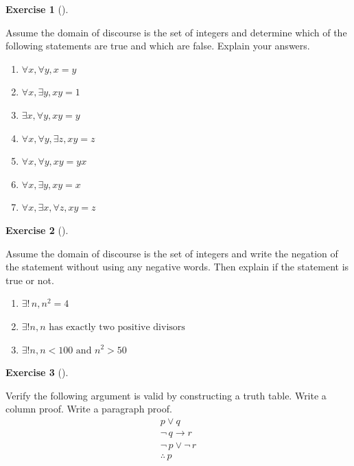 \documentclass[
  letterpaper,
  10pt,
  reqno,
  twopage,
  openany]{book}
\providecommand{\tightlist}{%
  \setlength{\itemsep}{0pt}\setlength{\parskip}{0pt}}\usepackage{longtable,booktabs,array}
\theoremstyle{plain}
\theoremstyle{definition}
\newtheorem{exercise}{Exercise}[chapter]
\theoremstyle{definition}
\theoremstyle{definition}
\theoremstyle{plain}
\theoremstyle{plain}
\theoremstyle{remark}
\begin{document}
\leavevmode{}%
\begin{exercise}[]\label{exr-statements-true-false}

Assume the domain of discourse is the set of integers and determine
which of the following statements are true and which are false. Explain
your answers.

\begin{enumerate}
\def\labelenumi{\arabic{enumi}.}
\tightlist
\item
  \(\forall x, \forall y, x=y\)
\item
  \(\forall x, \exists y, xy=1\)
\item
  \(\exists x, \forall y, xy=y\)
\item
  \(\forall x, \forall y, \exists z, xy=z\)
\item
  \(\forall x, \forall y, xy=yx\)
\item
  \(\forall x, \exists y , xy=x\)
\item
  \(\forall x, \exists x, \forall z, xy=z\)
\end{enumerate}

\end{exercise}

\leavevmode{}%
\begin{exercise}[]\label{exr-explian-true}

Assume the domain of discourse is the set of integers and write the
negation of the statement without using any negative words. Then explain
if the statement is true or not.

\begin{enumerate}
\def\labelenumi{\arabic{enumi}.}
\tightlist
\item
  \(\exists!\, n, n^2=4\)
\item
  \(\exists! n, n \text{ has exactly two positive divisors}\)
\item
  \(\exists ! n, n<100 \text{ and } n^2>50\)
\end{enumerate}

\end{exercise}

\leavevmode{}%
\begin{exercise}[]\label{exr-truth-table-proof}

Verify the following argument is valid by constructing a truth table.
Write a column proof. Write a paragraph proof.\\
\[ 
\begin{array}{l} p \lor q \\ \neg \, q \rightarrow r \\  \neg \, p \lor \neg \, r \\ \hline \therefore \, p \end{array}
\]

\end{exercise}
\end{document}
